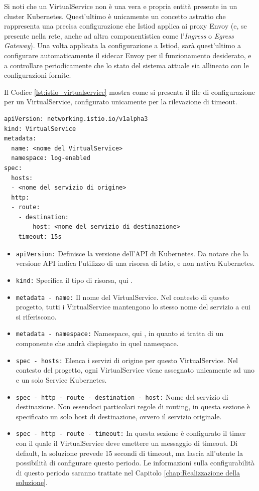 Si noti che un VirtualService non è una vera e propria entità presente in un cluster Kubernetes. Quest'ultimo è unicamente un concetto astratto che rappresenta una precisa configurazione che Istiod applica ai proxy Envoy (e, se presente nella rete, anche ad altra componentistica come l'\textit{Ingress} o \textit{Egress Gateway}). Una volta applicata la configurazione a Istiod, sarà quest'ultimo a configurare automaticamente il sidecar Envoy per il funzionamento desiderato, e a controllare periodicamente che lo stato del sistema attuale sia allineato con le configurazioni fornite.

Il Codice \ref{lst:istio_virtualservice} mostra come si presenta il file di configurazione per un VirtualService, configurato unicamente per la rilevazione di timeout.

\begin{lstlisting}[caption={Istio VirtualService per la rilevazione di timeout.}, label=lst:istio_virtualservice, keywordstyle=\color{black}, commentstyle=\color{black},stringstyle=\color{black},numberstyle=\color{black}, escapechar=|]
apiVersion: networking.istio.io/v1alpha3
kind: VirtualService
metadata:
  name: <nome del VirtualService>
  namespace: log-enabled
spec:
  hosts:
  - <nome del servizio di origine>
  http:
  - route:
    - destination:
        host: <nome del servizio di destinazione>
    timeout: 15s
\end{lstlisting}

\begin{itemize}
    \item \texttt{apiVersion:} Definisce la versione dell'API di Kubernetes. Da notare che la versione API indica l'utilizzo di una risorsa di Istio, e non nativa Kubernetes.
    \item \texttt{kind:} Specifica il tipo di risorsa, qui .
    \item \texttt{metadata - name:} Il nome del VirtualService. Nel contesto di questo progetto, tutti i VirtualService mantengono lo stesso nome del servizio a cui si riferiscono.
    \item \texttt{metadata - namespace:} Namespace, qui , in quanto si tratta di un componente che andrà dispiegato in quel namespace.
    \item \texttt{spec - hosts:} Elenca i servizi di origine per questo VirtualService. Nel contesto del progetto, ogni VirtualService viene assegnato unicamente ad uno e un solo Service Kubernetes.
    \item \texttt{spec - http - route - destination - host:} Nome del servizio di destinazione. Non essendoci particolari regole di routing, in questa sezione è specificato un solo host di destinazione, ovvero il servizio originale.
    \item \texttt{spec - http - route - timeout:} In questa sezione è configurato il timer con il quale il VirtualService deve emettere un messaggio di timeout. Di default, la soluzione prevede 15 secondi di timeout, ma lascia all'utente la possibilità di configurare questo periodo. Le informazioni sulla configurabilità di questo periodo saranno trattate nel Capitolo \ref{chap:Realizzazione della soluzione}.
\end{itemize}

